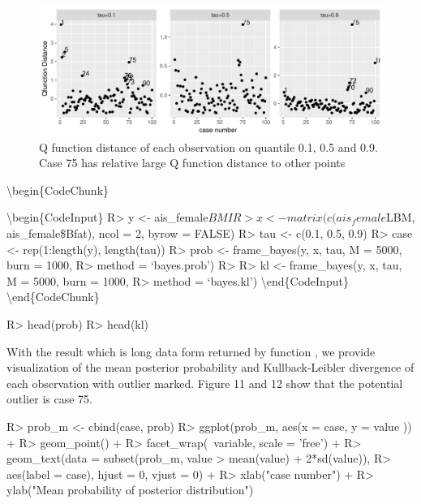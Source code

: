 \documentclass[article]{jss}
\theoremstyle{definition}
\theoremstyle{definition}
\theoremstyle{remark}
\begin{document}
\begin{CodeChunk}
\begin{figure}
{\centering \includegraphics{Diagnosing_outliers_and_visualization_of_quantile_regression_models_files/figure-latex/unnamed-chunk-6-1} 

}

\caption[Q function distance of each observation on quantile 0.1, 0.5 and 0.9]{Q function distance of each observation on quantile 0.1, 0.5 and 0.9. Case 75 has relative large Q function distance to other points}\label{fig:unnamed-chunk-6}
\end{figure}
\end{CodeChunk}

\textbackslash{}begin\{CodeChunk\}

\textbackslash{}begin\{CodeInput\} R\textgreater{} y \textless{}-
ais\_female\(BMI R> x <- matrix(c(ais_female\)LBM, ais\_female\$Bfat),
ncol = 2, byrow = FALSE) R\textgreater{} tau \textless{}- c(0.1, 0.5,
0.9) R\textgreater{} case \textless{}- rep(1:length(y), length(tau))
R\textgreater{} prob \textless{}- frame\_bayes(y, x, tau, M = 5000, burn
= 1000, R\textgreater{} method = `bayes.prob') R\textgreater{}
R\textgreater{} kl \textless{}- frame\_bayes(y, x, tau, M = 5000, burn =
1000, R\textgreater{} method = `bayes.kl')
\textbackslash{}end\{CodeInput\} \textbackslash{}end\{CodeChunk\}

\begin{CodeChunk}

\begin{CodeInput}
R> head(prob)
R> head(kl)
\end{CodeInput}
\end{CodeChunk}

With the result which is long data form returned by function
, we provide visualization of the mean posterior
probability and Kullback-Leibler divergence of each observation with
outlier marked. Figure 11 and 12 show that the potential outlier is case
75.

\begin{CodeChunk}

\begin{CodeInput}
R> prob_m <- cbind(case, prob)
R> ggplot(prob_m, aes(x = case, y = value )) +
R>    geom_point() +
R>    facet_wrap(~variable, scale = 'free') +
R>   geom_text(data = subset(prob_m, value > mean(value) + 2*sd(value)),
R>             aes(label = case), hjust = 0, vjust = 0) +
R>    xlab("case number") +
R>    ylab("Mean probability of posterior distribution")
\end{CodeInput}
\end{CodeChunk}
\end{document}

